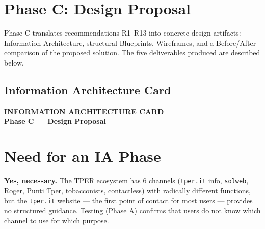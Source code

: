 ﻿\documentclass[11pt,a4paper]{article}
\begin{document}
\newpage
\section{Phase C: Design Proposal}

Phase C translates recommendations R1--R13 into concrete design artifacts: Information Architecture, structural Blueprints, Wireframes, and a Before/After comparison of the proposed solution. The five deliverables produced are described below.

\vspace{0.3cm}

\subsection{Information Architecture Card}


\begin{tcolorbox}[headerbox]
 \color{white}\LARGE\bfseries\sffamily INFORMATION ARCHITECTURE CARD \\[0.1cm]
 \color{white!80}\small\sffamily Phase C --- Design Proposal
\end{tcolorbox}

\vspace{0.3cm}

\section{Need for an IA Phase}

\begin{tcolorbox}[rffield]
\small\textbf{Yes, necessary.} The TPER ecosystem has 6 channels (\texttt{tper.it} info, \texttt{solweb}, Roger, Punti Tper, tobacconists, contactless) with radically different functions, but the \texttt{tper.it} website --- the first point of contact for most users --- provides no structured guidance. Testing (Phase A) confirms that users do not know which channel to use for which purpose.
\end{tcolorbox}

\end{document}
